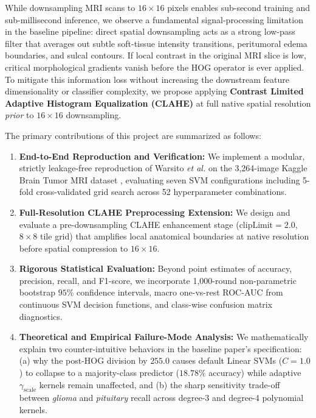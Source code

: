 \documentclass[conference]{IEEEtran}
\begin{document}
While downsampling MRI scans to $16 \times 16$ pixels enables sub-second training and sub-millisecond inference, we observe a fundamental signal-processing limitation in the baseline pipeline: direct spatial downsampling acts as a strong low-pass filter that averages out subtle soft-tissue intensity transitions, peritumoral edema boundaries, and sulcal contours. If local contrast in the original MRI slice is low, critical morphological gradients vanish before the HOG operator is ever applied. To mitigate this information loss without increasing the downstream feature dimensionality or classifier complexity, we propose applying \textbf{Contrast Limited Adaptive Histogram Equalization (CLAHE)} \cite{zuiderveld1994contrast} at full native spatial resolution \emph{prior} to $16 \times 16$ downsampling.

The primary contributions of this project are summarized as follows:
\begin{enumerate}
    \item \textbf{End-to-End Reproduction and Verification:} We implement a modular, strictly leakage-free reproduction of Warsito \emph{et al.} \cite{warsito2026lightweight} on the 3,264-image Kaggle Brain Tumor MRI dataset \cite{bhuvaji2020brain}, evaluating seven SVM configurations including 5-fold cross-validated grid search across 52 hyperparameter combinations.
    \item \textbf{Full-Resolution CLAHE Preprocessing Extension:} We design and evaluate a pre-downsampling CLAHE enhancement stage ($\text{clipLimit}=2.0$, $8 \times 8$ tile grid) that amplifies local anatomical boundaries at native resolution before spatial compression to $16 \times 16$.
    \item \textbf{Rigorous Statistical Evaluation:} Beyond point estimates of accuracy, precision, recall, and F1-score, we incorporate 1,000-round non-parametric bootstrap $95\%$ confidence intervals, macro one-vs-rest ROC-AUC from continuous SVM decision functions, and class-wise confusion matrix diagnostics.
    \item \textbf{Theoretical and Empirical Failure-Mode Analysis:} We mathematically explain two counter-intuitive behaviors in the baseline paper's specification: (a) why the post-HOG division by $255.0$ causes default Linear SVMs ($C=1.0$) to collapse to a majority-class predictor ($18.78\%$ accuracy) while adaptive $\gamma_{\text{scale}}$ kernels remain unaffected, and (b) the sharp sensitivity trade-off between \emph{glioma} and \emph{pituitary} recall across degree-3 and degree-4 polynomial kernels.
\end{enumerate}
\end{document}

